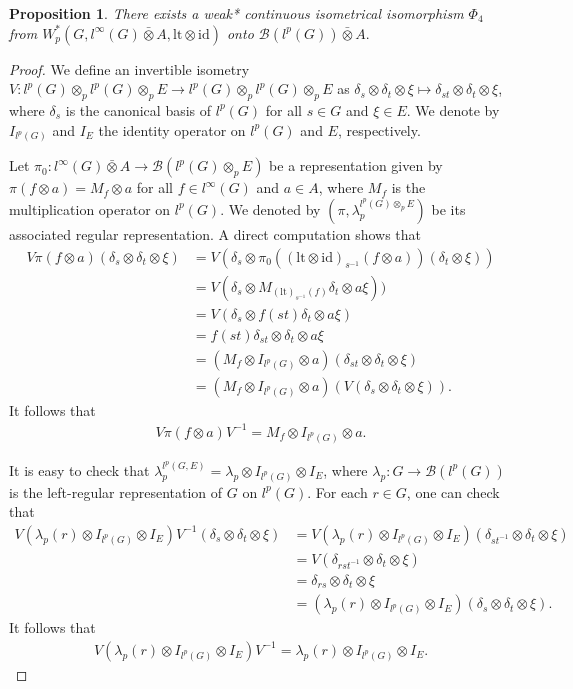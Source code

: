 \documentclass[reqno,11pt]{amsart}
\theoremstyle{plain}
\newtheorem{prop}[thm]{Proposition}
\theoremstyle{definition}
\theoremstyle{remark}
\begin{document}
\begin{prop}\label{4}
There exists a weak* continuous isometrical isomorphism $\Phi_4$ from $W^*_p(G,l^\infty(G)\bar{\otimes}A,\mathrm{lt}\otimes\mathrm{id})$ onto $\mathcal{B}(l^p(G))\bar{\otimes}A.$
\end{prop}
\begin{proof}
We define an invertible isometry $V:l^p(G)\otimes_p l^p(G)\otimes_p E\rightarrow l^p(G)\otimes_p l^p(G)\otimes_p E$ as $\delta_s\otimes\delta_t\otimes\xi\mapsto \delta_{st}\otimes \delta_{t}\otimes \xi$, where $\delta_s$ is the canonical basis of $l^p(G)$ for all $s\in G$ and $\xi\in E$.
We denote by $I_{l^p(G)}$ and $I_E$ the identity operator on $l^p(G)$ and $E$, respectively.

Let $\pi_0:l^\infty(G)\bar{\otimes}A\rightarrow \mathcal{B}(l^p(G)\otimes_pE)$ be a representation given by $\pi(f\otimes a)=M_f\otimes a$ for all $f\in l^\infty(G)$ and $a\in A$, where $M_f$ is the multiplication operator on $l^p(G)$. We denoted by $(\pi,\lambda_p^{l^p(G)\otimes_p E})$ be its associated regular representation.
A direct computation shows that $$\begin{aligned} V\pi(f\otimes a)(\delta_s\otimes\delta_t\otimes\xi)&=
V(\delta_s\otimes\pi_0((\mathrm{lt}\otimes\mathrm{id})_{s^{-1}}(f\otimes a))(\delta_t\otimes\xi))\\
&= V(\delta_s\otimes M_{(\mathrm{lt})_{s^{-1}}(f)}\delta_t\otimes a\xi))\\
&=V(\delta_s\otimes f(st)\delta_t\otimes a\xi)\\
&=f(st)\delta_{st}\otimes \delta_{t}\otimes a\xi\\
&=(M_f\otimes I_{l^p(G)}\otimes a)(\delta_{st}\otimes \delta_{t}\otimes \xi)\\
&=(M_f\otimes I_{l^p(G)}\otimes a)(V(\delta_s\otimes \delta_t\otimes\xi)). \end{aligned}$$
It follows that \begin{align}\label{pi}
V\pi(f\otimes a)V^{-1}= M_f\otimes I_{l^p(G)}\otimes a.
\end{align}

It is easy to check that $\lambda_p^{l^p(G,E)}=\lambda_p\otimes I_{l^p(G)}\otimes I_E$, where $\lambda_p:G\rightarrow \mathcal{B}(l^p(G))$ is the left-regular representation of $G$ on $l^p(G)$.
For each $r\in G$, one can check that  $$\begin{aligned} V(\lambda_p(r)\otimes I_{l^p(G)} \otimes I_E)V^{-1}(\delta_s\otimes\delta_t\otimes\xi)&=
 V(\lambda_p(r)\otimes I_{l^p(G)} \otimes I_E)(\delta_{st^{-1}}\otimes\delta_{t}\otimes\xi)\\
&=V(\delta_{rst^{-1}}\otimes\delta_t\otimes \xi)\\
&=\delta_{rs}\otimes \delta_{t}\otimes\xi\\
&=(\lambda_p(r)\otimes I_{l^p(G)}\otimes I_E)(\delta_s\otimes\delta_t\otimes\xi). \end{aligned}$$
It follows that \begin{align}\label{lambda}
V( \lambda_p(r)\otimes I_{l^p(G)}\otimes I_E)V^{-1}=\lambda_p(r)\otimes I_{l^p(G)}\otimes I_E.\end{align}


\end{proof}
\end{document}
